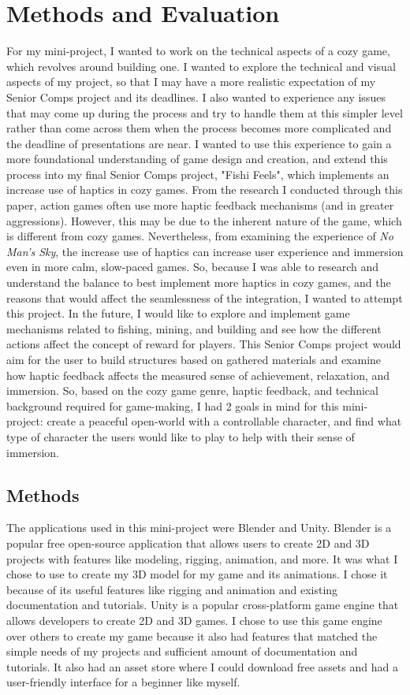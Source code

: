 \documentclass[10pt,twocolumn]{article}
\begin{document}
\section{Methods and Evaluation}
For my mini-project, I wanted to work on the technical aspects of a cozy game, which revolves around building one. I wanted to explore the technical and visual aspects of my project, so that I may have a more realistic expectation of my Senior Comps project and its deadlines. I also wanted to experience any issues that may come up during the process and try to handle them at this simpler level rather than come across them when the process becomes more complicated and the deadline of presentations are near. I wanted to use this experience to gain a more foundational understanding of game design and creation, and extend this process into my final Senior Comps project, "Fishi Feels", which implements an increase use of haptics in cozy games. From the research I conducted through this paper, action games often use more haptic feedback mechanisms (and in greater aggressions). However, this may be due to the inherent nature of the game, which is different from cozy games. Nevertheless, from examining the experience of \textit{No Man's Sky}\cite{nomanssky2016}, the increase use of haptics can increase user experience and immersion even in more calm, slow-paced games. So, because I was able to research and understand the balance to best implement more haptics in cozy games, and the reasons that would affect the seamlessness of the integration, I wanted to attempt this project. In the future, I would like to explore and implement game mechanisms related to fishing, mining, and building and see how the different actions affect the concept of reward for players. This Senior Comps project would aim for the user to build structures based on gathered materials and examine how haptic feedback affects the measured sense of achievement, relaxation, and immersion. So, based on the cozy game genre, haptic feedback, and technical background required for game-making, I had 2 goals in mind for this mini-project: create a peaceful open-world with a controllable character, and find what type of character the users would like to play to help with their sense of immersion.

\subsection{Methods}
The applications used in this mini-project were Blender and Unity. Blender is a popular free open-source application that allows users to create 2D and 3D projects with features like modeling, rigging, animation, and more. It was what I chose to use to create my 3D model for my game and its animations. I chose it because of its useful features like rigging and animation and existing documentation and tutorials. Unity is a popular cross-platform game engine that allows developers to create 2D and 3D games. I chose to use this game engine over others to create my game because it also had features that matched the simple needs of my projects and sufficient amount of documentation and tutorials. It also had an asset store where I could download free assets and had a user-friendly interface for a beginner like myself.
\end{document}
